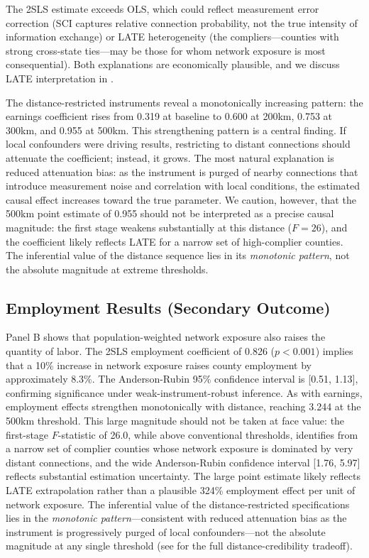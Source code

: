 \documentclass[12pt]{article}
\begin{document}
The 2SLS estimate exceeds OLS, which could reflect measurement error correction (SCI captures relative connection probability, not the true intensity of information exchange) or LATE heterogeneity (the compliers---counties with strong cross-state ties---may be those for whom network exposure is most consequential). Both explanations are economically plausible, and we discuss LATE interpretation in .

The distance-restricted instruments reveal a monotonically increasing pattern: the earnings coefficient rises from 0.319 at baseline to 0.600 at 200km, 0.753 at 300km, and 0.955 at 500km. This strengthening pattern is a central finding. If local confounders were driving results, restricting to distant connections should attenuate the coefficient; instead, it grows. The most natural explanation is reduced attenuation bias: as the instrument is purged of nearby connections that introduce measurement noise and correlation with local conditions, the estimated causal effect increases toward the true parameter. We caution, however, that the 500km point estimate of 0.955 should not be interpreted as a precise causal magnitude: the first stage weakens substantially at this distance ($F = 26$), and the coefficient likely reflects LATE for a narrow set of high-complier counties. The inferential value of the distance sequence lies in its \textit{monotonic pattern}, not the absolute magnitude at extreme thresholds.

\subsection{Employment Results (Secondary Outcome)}

Panel B shows that population-weighted network exposure also raises the quantity of labor. The 2SLS employment coefficient of 0.826 ($p < 0.001$) implies that a 10\% increase in network exposure raises county employment by approximately 8.3\%. The Anderson-Rubin 95\% confidence interval is [0.51, 1.13], confirming significance under weak-instrument-robust inference. As with earnings, employment effects strengthen monotonically with distance, reaching 3.244 at the 500km threshold. This large magnitude should not be taken at face value: the first-stage $F$-statistic of 26.0, while above conventional thresholds, identifies from a narrow set of complier counties whose network exposure is dominated by very distant connections, and the wide Anderson-Rubin confidence interval [1.76, 5.97] reflects substantial estimation uncertainty. The large point estimate likely reflects LATE extrapolation rather than a plausible 324\% employment effect per unit of network exposure. The inferential value of the distance-restricted specifications lies in the \textit{monotonic pattern}---consistent with reduced attenuation bias as the instrument is progressively purged of local confounders---not the absolute magnitude at any single threshold (see  for the full distance-credibility tradeoff).
\end{document}
